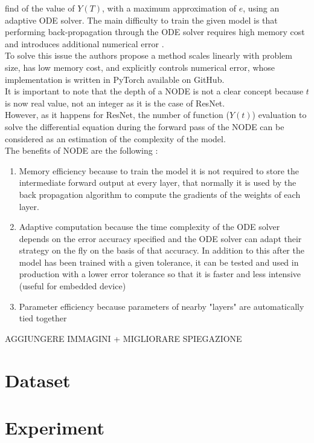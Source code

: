 \documentclass[LaM,binding=0.6cm]{sapthesis}
\begin{document}
find of the value of $Y(T)$, with a maximum approximation of $e$, using an adaptive ODE solver.
The main difficulty to train the given model is that performing back-propagation through the ODE solver requires high memory cost and introduces additional numerical error \cite{2}.\\To solve this issue the authors propose a method scales linearly with problem size, has low memory cost, and explicitly controls numerical error, whose implementation is written in PyTorch available on GitHub.\\It is important to note that the depth of a NODE is not a clear concept because $t$ is now real value, not an integer as it is the case of ResNet.\\However, as it happens for ResNet, the number of function ($Y(t)$) evaluation to solve the differential equation during the forward pass of the NODE can be considered as an estimation of the complexity of the  model.\\The benefits of NODE are the following \cite{2}:
\begin{enumerate}
\item Memory efficiency because to train the model it is not required to store the intermediate forward output at every layer, that normally it is used by the back propagation algorithm to compute the gradients of the weights of each layer.
\item Adaptive computation because the time complexity of the ODE solver depends on the error accuracy specified and the ODE solver can adapt their strategy on the fly on the basis of that accuracy.  In addition to this after the model has been trained with a given tolerance, it can be tested and used in production with a lower error tolerance so that it is faster and less intensive (useful for embedded device)
\item Parameter efficiency because parameters of nearby "layers" are automatically tied together
\end{enumerate}
AGGIUNGERE IMMAGINI + MIGLIORARE SPIEGAZIONE

\chapter{Dataset}\label{datasec}


\chapter{Experiment}
\end{document}
